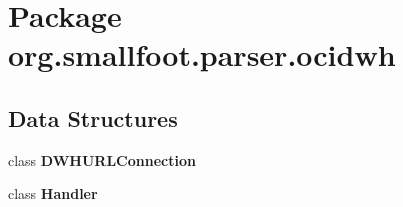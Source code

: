 \section{Package org.\+smallfoot.\+parser.\+ocidwh}
\label{namespaceorg_1_1smallfoot_1_1parser_1_1ocidwh}
\subsection*{Data Structures}
\begin{DoxyCompactItemize}
\item 
class {\bf D\+W\+H\+U\+R\+L\+Connection}
\item 
class {\bf Handler}
\end{DoxyCompactItemize}
